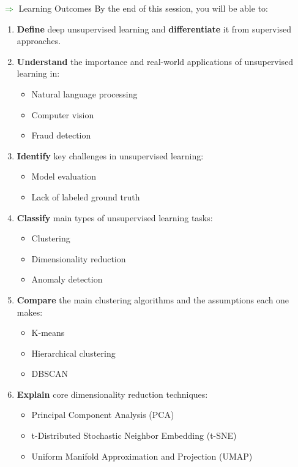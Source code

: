 \begin{frame}[allowframebreaks]{\textcolor{green}{$\Rightarrow$} Learning Outcomes}
    By the end of this session, you will be able to:
    \begin{enumerate}
        \item \textbf{Define} deep unsupervised learning and \textbf{differentiate} it from supervised approaches.
        \item \textbf{Understand} the importance and real-world applications of unsupervised learning in:
        \begin{itemize}
            \item Natural language processing
            \item Computer vision
            \item Fraud detection
        \end{itemize}
        \item \textbf{Identify} key challenges in unsupervised learning:
        \begin{itemize}
            \item Model evaluation
            \item Lack of labeled ground truth
        \end{itemize}

        \framebreak

        \item \textbf{Classify} main types of unsupervised learning tasks:
        \begin{itemize}
            \item Clustering
            \item Dimensionality reduction
            \item Anomaly detection
        \end{itemize}
        \item \textbf{Compare} the main clustering algorithms and the assumptions each one makes:
        \begin{itemize}
            \item K-means
            \item Hierarchical clustering
            \item DBSCAN
        \end{itemize}
        \item \textbf{Explain} core dimensionality reduction techniques:
        \begin{itemize}
            \item Principal Component Analysis (PCA)
            \item t-Distributed Stochastic Neighbor Embedding (t-SNE)
            \item Uniform Manifold Approximation and Projection (UMAP)
        \end{itemize}
    \end{enumerate}
\end{frame}
